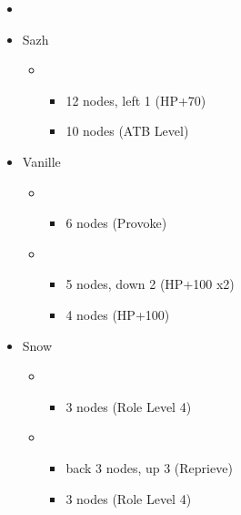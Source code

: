 \begin{menu}
	\begin{itemize}
		\paradigm
		\begin{itemize}
			\item {}%
				{\paradigmline{\com}{\com}{\com}}%
				{\paradigmline{\com}{\com}{\com}}%
				{\paradigmline[4]{\com}{(\rav)}{(\rav)}}%
				{\paradigmline{\syn}{\sab}{(\com)}}%
				{\paradigmline{(\rav)}{\med}{(\rav)}}%
				{\paradigmline{\rav}{\rav}{\rav}}%
		\end{itemize}
		\crystarium
		\begin{itemize}
			\item Sazh
				\begin{itemize}
					\item \syn
						\begin{itemize}
							\item 12 nodes, left 1 (HP+70)
							\item 10 nodes (ATB Level)
						\end{itemize}
				\end{itemize}
			\item Vanille
				\begin{itemize}
					\item \sen
						\begin{itemize}
							\item 6 nodes (Provoke)
						\end{itemize}
					\item \sab
						\begin{itemize}
							\item 5 nodes, down 2 (HP+100 x2)
							\item 4 nodes (HP+100)
						\end{itemize}
				\end{itemize}
			\item Snow
				\begin{itemize}
					\item \rav
						\begin{itemize}
							\item 3 nodes (Role Level 4)
						\end{itemize}
					\item \sen
						\begin{itemize}
							\item back 3 nodes, up 3 (Reprieve)
							\item 3 nodes (Role Level 4)
						\end{itemize}

\end{itemize}
\end{itemize}
\end{itemize}
\end{menu}
